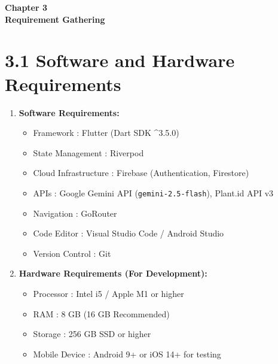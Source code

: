 \documentclass[12pt]{article}
\begin{document}
\vspace*{\fill}
\begin{center}
\textbf{\Huge{Chapter 3}}\\
\vspace{5mm}
\textbf{\Huge{Requirement Gathering}}
\end{center}
\vspace*{\fill}
\newpage

\section*{3.1 \quad Software and Hardware Requirements}
\justify

\begin{enumerate}[label={\Roman*.}]
    \item \textbf{Software Requirements:}
    \begin{itemize}
        \item Framework \hspace{20mm}: Flutter (Dart SDK \^{}3.5.0)
        \item State Management \hspace{6mm}: Riverpod
        \item Cloud Infrastructure \hspace{3mm}: Firebase (Authentication, Firestore)
        \item APIs \hspace{28mm}: Google Gemini API (\texttt{gemini-2.5-flash}), Plant.id API v3
        \item Navigation \hspace{18mm}: GoRouter
        \item Code Editor \hspace{15mm}: Visual Studio Code / Android Studio
        \item Version Control \hspace{9mm}: Git
    \end{itemize}

    \item \textbf{Hardware Requirements (For Development):}
    \begin{itemize}
        \item Processor \hspace{19mm}: Intel i5 / Apple M1 or higher
        \item RAM \hspace{26mm}: 8 GB (16 GB Recommended)
        \item Storage \hspace{22mm}: 256 GB SSD or higher
        \item Mobile Device \hspace{12mm}: Android 9+ or iOS 14+ for testing
    \end{itemize}


\end{enumerate}
\end{document}
